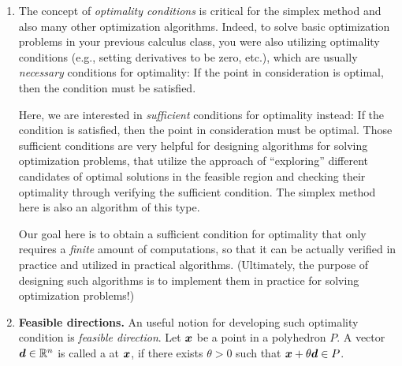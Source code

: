 \begin{enumerate}
\item The concept of \emph{optimality conditions} is critical for the simplex
method and also many other optimization algorithms. Indeed, to
solve basic optimization problems in your previous calculus class, you were
also utilizing optimality conditions (e.g., setting derivatives to be zero,
etc.), which are usually \emph{necessary} conditions for optimality: If the
point in consideration is optimal, then the condition must be satisfied.

Here, we are interested in \emph{sufficient} conditions for optimality instead:
If the condition is satisfied, then the point in consideration must be optimal.
Those sufficient conditions are very helpful for designing algorithms for
solving optimization problems, that utilize the approach of ``exploring''
different candidates of optimal solutions in the feasible region and checking
their optimality through verifying the sufficient condition. The simplex method
here is also an algorithm of this type.

Our goal here is to obtain a sufficient condition for optimality that only
requires a \emph{finite} amount of computations, so that it can be actually
verified in practice and utilized in practical algorithms. (Ultimately, the
purpose of designing such algorithms is to implement them in practice for
solving optimization problems!)

\item \textbf{Feasible directions.} An useful notion for developing such
optimality condition is \emph{feasible direction}. Let \(\bm{x}\) be a point
in a polyhedron \(P\). A vector \(\bm{d}\in\mathbb{R}^n\) is called a  at \(\bm{x}\), if there exists \(\theta>0\) such that
\(\bm{x}+\theta \bm{d}\in P\).


\end{enumerate}

